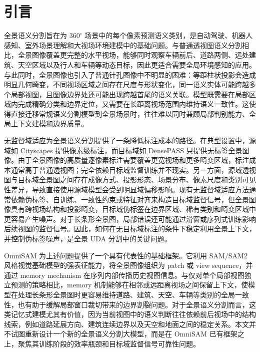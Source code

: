 \section{引言}
\label{sec:introduction}

全景语义分割旨在为 $360^\circ$ 场景中的每个像素预测语义类别，是自动驾驶、机器人感知、室外场景理解和大视场环境建模中的基础问题。与普通透视图语义分割相比，全景图像覆盖更完整的水平视场，能够同时观察车辆前后、道路两侧、远处建筑、天空区域以及行人和车辆等动态目标，因此更适合需要全局环境感知的应用。与此同时，全景图像也引入了普通针孔图像中不明显的困难：等距柱状投影会造成明显几何畸变，不同视场区域之间存在尺度与形状变化，同一语义实体可能跨越多个局部视图，且图像边界处还可能出现跨越首尾的语义关联。模型既需要在局部区域内完成精确分类和边界定位，又需要在长距离视场范围内维持语义一致性。这使得直接迁移常规语义分割模型到全景场景时，往往难以同时兼顾局部判别能力、全局上下文建模和边界质量。

无监督域适应为全景语义分割提供了一条降低标注成本的路径。在典型设置中，源域如 Cityscapes 提供像素级标注，而目标域如 DensePASS 只提供无标签全景图像。由于全景图像的高质量逐像素标注需要覆盖更宽视场和更多畸变区域，标注成本通常高于普通透视图；完全依赖目标域监督训练并不现实。另一方面，源域透视图与目标域全景图之间存在成像方式、投影形态、场景分布、像素尺度和类别可见性差异，导致直接使用源域模型会受到明显域偏移影响。现有无监督域适应方法通常依赖伪标签、自训练、一致性约束或特征对齐来构造目标域监督信号，但全景图像具有跨视场结构和投影畸变，目标域伪标签在边界区域、稀有类别和畸变区域中更容易产生噪声。对于长条形全景图，局部错误还可能通过滑窗或序列式训练影响后续视图的监督信号。因此，如何在无目标域标注的条件下稳定利用全景上下文，并控制伪标签噪声，是全景 UDA 分割中的关键问题。

OmniSAM 为上述问题提供了一个具有代表性的基础框架。它利用 SAM/SAM2 风格视觉基础模型的强表征能力，将全景图像组织为 patch 或 view sequence，并通过 memory mechanism 在序列内部传播历史视图信息。与仅对单个局部视图独立预测的策略相比，memory 机制能够在相邻或远距离视场之间保留上下文，使模型在处理长条形全景图时更容易维持道路、建筑、天空、车辆等类别的全局一致性，也有助于缓解局部窗口裁切带来的边界割裂问题。对于全景语义分割而言，这类记忆式建模尤其有价值，因为当前视图中的语义判断往往依赖前后视场中的结构线索，例如道路延展方向、建筑连续边界以及天空和地面之间的稳定关系。本文并不试图重新设计一个新的全景语义分割大模型，而是在 OmniSAM 已有框架之上，聚焦其训练阶段的效率瓶颈和目标域监督信号可靠性问题。

